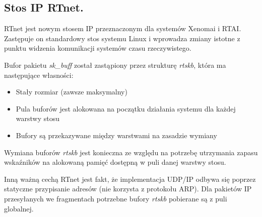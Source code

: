 \subsection{Stos IP RTnet.}

RTnet jest nowym stosem IP przeznaczonym dla systemów Xenomai i RTAI. Zastępuje on standardowy stos systemu Linux i wprowadza zmiany istotne z punktu widzenia komunikacji systemów czasu rzeczywistego.

Bufor pakietu \emph{sk\_buff} został zastąpiony przez strukturę \emph{rtskb}, która ma następujące własności:

\begin{itemize}
\item Stały rozmiar (zawsze maksymalny)
\item Pula buforów jest alokowana na początku działania systemu dla każdej warstwy stosu
\item Bufory są przekazywane między warstwami na zasadzie wymiany
\end{itemize}

Wymiana buforów \emph{rtskb} jest konieczna ze względu na potrzebę utrzymania zapasu wskaźników na alokowaną pamięć dostępną w puli danej warstwy stosu.

Inną ważną cechą RTnet jest fakt, że implementacja UDP/IP odbywa się poprzez statyczne przypisanie adresów (nie korzysta z protokołu ARP). Dla pakietów IP przesyłanych we fragmentach potrzebne bufory \emph{rtskb} pobierane są z puli globalnej.

